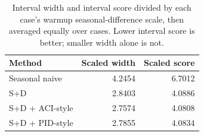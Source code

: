 \begin{table}[htbp]\centering\footnotesize
\caption{Interval width and interval score divided by each case's warmup seasonal-difference scale, then averaged equally over cases. Lower interval score is better; smaller width alone is not.}
\label{tab:efficiency}
\begin{tabular}{lrr}
\toprule
Method & Scaled width & Scaled score\\\midrule
Seasonal naive & 4.2454 & 6.7012\\
S+D & 2.8403 & 4.0886\\
S+D + ACI-style & 2.7574 & 4.0808\\
S+D + PID-style & 2.7855 & 4.0834\\
\bottomrule\end{tabular}\end{table}
